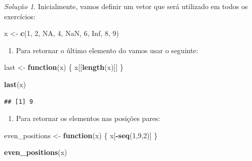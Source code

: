 \documentclass[
]{latex/krantz}
\newenvironment{Shaded}{\begin{snugshade}}{\end{snugshade}}
\newcommand{\ConstantTok}[1]{\textcolor[rgb]{0.56,0.35,0.01}{#1}}
\newcommand{\ControlFlowTok}[1]{\textcolor[rgb]{0.13,0.29,0.53}{\textbf{#1}}}
\newcommand{\DecValTok}[1]{\textcolor[rgb]{0.00,0.00,0.81}{#1}}
\newcommand{\FunctionTok}[1]{\textcolor[rgb]{0.13,0.29,0.53}{\textbf{#1}}}
\newcommand{\NormalTok}[1]{#1}
\newcommand{\OtherTok}[1]{\textcolor[rgb]{0.56,0.35,0.01}{#1}}
\newcommand{\SpecialCharTok}[1]{\textcolor[rgb]{0.81,0.36,0.00}{\textbf{#1}}}
\providecommand{\tightlist}{%
  \setlength{\itemsep}{0pt}\setlength{\parskip}{0pt}}
\theoremstyle{definition}
\theoremstyle{definition}
\theoremstyle{definition}
\theoremstyle{definition}
\theoremstyle{remark}
\newtheorem*{solution}{Solução}
\begin{document}
\begin{solution}

Inicialmente, vamos definir um vetor que será utilizado em todos os exercícios:

\begin{Shaded}
\begin{Highlighting}[]
\NormalTok{x }\OtherTok{\textless{}{-}} \FunctionTok{c}\NormalTok{(}\DecValTok{1}\NormalTok{, }\DecValTok{2}\NormalTok{, }\ConstantTok{NA}\NormalTok{, }\DecValTok{4}\NormalTok{, }\ConstantTok{NaN}\NormalTok{, }\DecValTok{6}\NormalTok{, }\ConstantTok{Inf}\NormalTok{, }\DecValTok{8}\NormalTok{, }\DecValTok{9}\NormalTok{)}
\end{Highlighting}
\end{Shaded}

\begin{enumerate}
\def\labelenumi{\alph{enumi}.}
\tightlist
\item
  Para retornar o último elemento do vamos usar o seguinte:
\end{enumerate}

\begin{Shaded}
\begin{Highlighting}[]
\NormalTok{last }\OtherTok{\textless{}{-}} \ControlFlowTok{function}\NormalTok{(x) \{}
\NormalTok{  x[[}\FunctionTok{length}\NormalTok{(x)]]}
\NormalTok{\}}

\FunctionTok{last}\NormalTok{(x)}
\end{Highlighting}
\end{Shaded}

\begin{verbatim}
## [1] 9
\end{verbatim}

\begin{enumerate}
\def\labelenumi{\alph{enumi}.}
\setcounter{enumi}{1}
\tightlist
\item
  Para retornar os elementos nas posições pares:
\end{enumerate}

\begin{Shaded}
\begin{Highlighting}[]
\NormalTok{even\_positions }\OtherTok{\textless{}{-}} \ControlFlowTok{function}\NormalTok{(x) \{}
\NormalTok{  x[}\SpecialCharTok{{-}}\FunctionTok{seq}\NormalTok{(}\DecValTok{1}\NormalTok{,}\DecValTok{9}\NormalTok{,}\DecValTok{2}\NormalTok{)]}
\NormalTok{\}}

\FunctionTok{even\_positions}\NormalTok{(x)}
\end{Highlighting}
\end{Shaded}


\end{solution}
\end{document}
